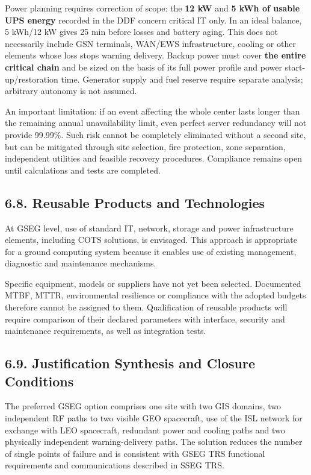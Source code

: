 Power planning requires correction of scope: the \textbf{12 kW} and \textbf{5 kWh of usable UPS energy} recorded in the DDF concern critical IT only. In an ideal balance, 5 kWh/\allowbreak{}12 kW gives 25 min before losses and battery aging. This does not necessarily include GSN terminals, WAN/\allowbreak{}EWS infrastructure, cooling or other elements whose loss stops warning delivery. Backup power must cover \textbf{the entire critical chain} and be sized on the basis of its full power profile and power start-up/\allowbreak{}restoration time. Generator supply and fuel reserve require separate analysis; arbitrary autonomy is not assumed.

An important limitation: if an event affecting the whole center lasts longer than the remaining annual unavailability limit, even perfect server redundancy will not provide 99.99\%. Such risk cannot be completely eliminated without a second site, but can be mitigated through site selection, fire protection, zone separation, independent utilities and feasible recovery procedures. Compliance remains open until calculations and tests are completed.

\subsection{6.8. Reusable Products and Technologies}\label{ddjf-6-8}

At GSEG level, use of standard IT, network, storage and power infrastructure elements, including COTS solutions, is envisaged. This approach is appropriate for a ground computing system because it enables use of existing management, diagnostic and maintenance mechanisms.

Specific equipment, models or suppliers have not yet been selected. Documented MTBF, MTTR, environmental resilience or compliance with the adopted budgets therefore cannot be assigned to them. Qualification of reusable products will require comparison of their declared parameters with interface, security and maintenance requirements, as well as integration tests.

\subsection{6.9. Justification Synthesis and Closure Conditions}\label{ddjf-6-9}

The preferred GSEG option comprises one site with two GIS domains, two independent RF paths to two visible GEO spacecraft, use of the ISL network for exchange with LEO spacecraft, redundant power and cooling paths and two physically independent warning-delivery paths. The solution reduces the number of single points of failure and is consistent with GSEG TRS functional requirements and communications described in SSEG TRS.

